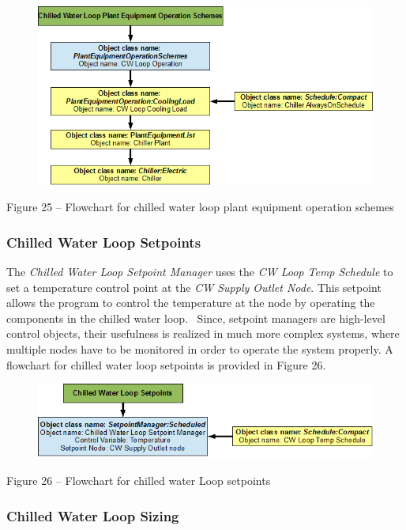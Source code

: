 \begin{figure}[htbp]
\centering
\includegraphics{media/image025.png}
\caption{}
\end{figure}

Figure 25 -- Flowchart for chilled water loop plant equipment operation schemes

\subsubsection{Chilled Water Loop Setpoints}\label{chilled-water-loop-setpoints}

The \emph{Chilled Water Loop Setpoint Manager} uses the \emph{CW Loop Temp Schedule} to set a temperature control point at the \emph{CW Supply Outlet Node}. This setpoint allows the program to control the temperature at the node by operating the components in the chilled water loop. ~Since, setpoint managers are high-level control objects, their usefulness is realized in much more complex systems, where multiple nodes have to be monitored in order to operate the system properly. A flowchart for chilled water loop setpoints is provided in Figure 26.

\begin{figure}[htbp]
\centering
\includegraphics{media/image026.png}
\caption{}
\end{figure}

Figure 26 -- Flowchart for chilled water Loop setpoints

\subsubsection{Chilled Water Loop Sizing}\label{chilled-water-loop-sizing}

